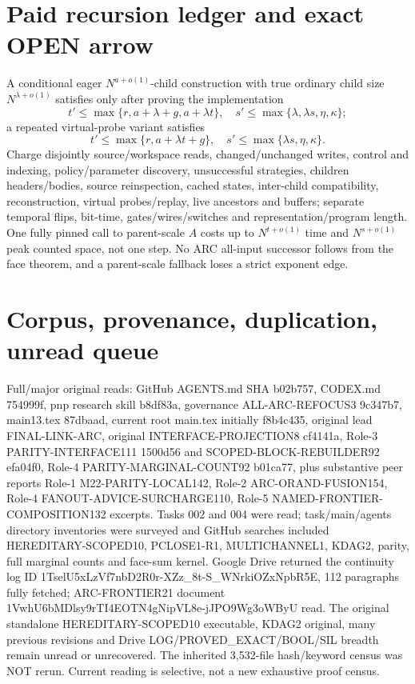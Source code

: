 \documentclass[11pt]{article}
\begin{document}
\section{Paid recursion ledger and exact OPEN arrow}
A conditional eager $N^{a+o(1)}$-child construction with true ordinary child size $N^{\lambda+o(1)}$ satisfies only after proving the implementation
\[
t'\le\max\{r,a+\lambda+g,a+\lambda t\},\quad
s'\le\max\{\lambda,\lambda s,\eta,\kappa\};
\]
a repeated virtual-probe variant satisfies
\[
t'\le\max\{r,a+\lambda t+g\},\quad
s'\le\max\{\lambda s,\eta,\kappa\}.
\]
Charge disjointly source/workspace reads, changed/unchanged writes, control and indexing, policy/parameter discovery, unsuccessful strategies, children headers/bodies, source reinspection, cached states, inter-child compatibility, reconstruction, virtual probes/replay, live ancestors and buffers; separate temporal flips, bit-time, gates/wires/switches and representation/program length. One fully pinned call to parent-scale $A$ costs up to $N^{t+o(1)}$ time and $N^{s+o(1)}$ peak counted space, not one step. No ARC all-input successor follows from the face theorem, and a parent-scale fallback loses a strict exponent edge.

\section{Corpus, provenance, duplication, unread queue}
Full/major original reads: GitHub AGENTS.md SHA b02b757, CODEX.md 754999f, pnp research skill b8df83a, governance ALL-ARC-REFOCUS3 9c347b7, main13.tex 87dbaad, current root main.tex initially f8b4c435, original lead FINAL-LINK-ARC, original INTERFACE-PROJECTION8 cf4141a, Role-3 PARITY-INTERFACE111 1500d56 and SCOPED-BLOCK-REBUILDER92 efa04f0, Role-4 PARITY-MARGINAL-COUNT92 b01ca77, plus substantive peer reports Role-1 M22-PARITY-LOCAL142, Role-2 ARC-ORAND-FUSION154, Role-4 FANOUT-ADVICE-SURCHARGE110, Role-5 NAMED-FRONTIER-COMPOSITION132 excerpts. Tasks 002 and 004 were read; task/main/agents directory inventories were surveyed and GitHub searches included HEREDITARY-SCOPED10, PCLOSE1-R1, MULTICHANNEL1, KDAG2, parity, full marginal counts and face-sum kernel. Google Drive returned the continuity log ID 1TselU5xLzVf7nbD2R0r-XZz_8t-S_WNrkiOZxNpbR5E, 112 paragraphs fully fetched; ARC-FRONTIER21 document 1VwhU6bMDlsy9rTI4EOTN4gNipVL8e-jJPO9Wg3oWByU read. The original standalone HEREDITARY-SCOPED10 executable, KDAG2 original, many previous revisions and Drive LOG/PROVED_EXACT/BOOL/SIL breadth remain unread or unrecovered. The inherited 3,532-file hash/keyword census was NOT rerun. Current reading is selective, not a new exhaustive proof census.
\end{document}

